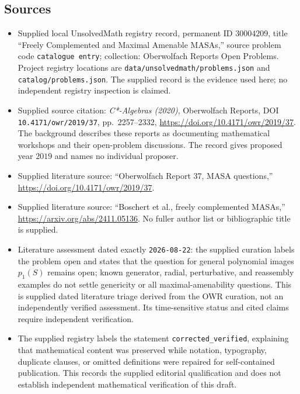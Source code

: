 \documentclass[11pt]{article}
\begin{document}
\subsection{Sources}
\begin{itemize}
\item Supplied local UnsolvedMath registry record, permanent ID \(30004209\), title ``Freely Complemented and Maximal Amenable MASAs,'' source problem code \texttt{catalogue entry}; collection: Oberwolfach Reports Open Problems. Project registry locations are \texttt{data/unsolvedmath/problems.json} and \texttt{catalog/problems.json}. The supplied record is the evidence used here; no independent registry inspection is claimed.
\item Supplied source citation: \emph{C*-Algebras (2020)}, Oberwolfach Reports, DOI \texttt{10.4171/owr/2019/37}, pp.\ 2257--2332, \url{https://doi.org/10.4171/owr/2019/37}. The background describes these reports as documenting mathematical workshops and their open-problem discussions. The record gives proposed year \(2019\) and names no individual proposer.
\item Supplied literature source: ``Oberwolfach Report 37, MASA questions,'' \url{https://doi.org/10.4171/owr/2019/37}.
\item Supplied literature source: ``Boschert et al., freely complemented MASAs,'' \url{https://arxiv.org/abs/2411.05136}. No fuller author list or bibliographic title is supplied.
\item Literature assessment dated exactly \texttt{2026-08-22}: the supplied curation labels the problem open and states that the question for general polynomial images \(p_1(S)\) remains open; known generator, radial, perturbative, and reassembly examples do not settle genericity or all maximal-amenability questions. This is supplied dated literature triage derived from the OWR curation, not an independently verified assessment. Its time-sensitive status and cited claims require independent verification.
\item The supplied registry labels the statement \texttt{corrected\_verified}, explaining that mathematical content was preserved while notation, typography, duplicate clauses, or omitted definitions were repaired for self-contained publication. This records the supplied editorial qualification and does not establish independent mathematical verification of this draft.
\end{itemize}
\end{document}
